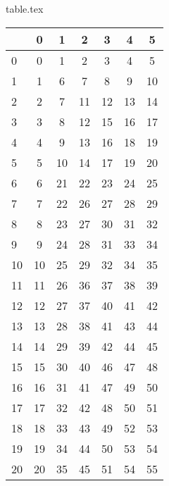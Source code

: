 
\begin{filecontents*}{table.tex}
\begin{tabular}{|l|cccccc|}
\hline
& 0 &  1 &  2 &  3 &  4 &  5 \\
\hline
 0& 0 &  1 &  2 &  3 &  4 &  5 \\
 1 &  1 &  6 &  7 &  8 &  9 & 10 \\
 2&   2 &  7 & 11 & 12 & 13 & 14 \\
3 &  3 &  8 & 12 & 15 & 16 & 17 \\
4 &  4 &  9 & 13 & 16 & 18 & 19 \\
 5&  5 & 10 & 14 & 17 & 19 & 20 \\ \cline{2-7}
 6&  \multicolumn{1}{|c|}{  6 }& 21 & 22 & 23 & 24 & 25\\
7 &   \multicolumn{1}{|c|}{ 7 }& 22 & 26 & 27 & 28 & 29\\
 8&   \multicolumn{1}{|c|}{ 8 }& 23 & 27 & 30 & 31 & 32\\
 9&   \multicolumn{1}{|c|}{ 9 }& 24 & 28 & 31 & 33 & 34\\
 10&  \multicolumn{1}{|c|}{ 10} & 25 & 29 & 32 & 34 & 35 \\ \cline{3-7}
 11&  11 &  \multicolumn{1}{c|}{ 26 }& 36 & 37 & 38 & 39 \\
 12&  12 & \multicolumn{1}{c|}{  27} & 37 & 40 & 41 & 42 \\
13& 13 &   \multicolumn{1}{c|}{  28} & 38 & 41 & 43 & 44 \\
14& 14 &   \multicolumn{1}{c|}{  29} & 39 & 42 & 44 & 45 \\  \cline{4-7}
15&  15 & 30 & \multicolumn{1}{c|}{   40 }& 46 & 47 & 48 \\
16&  16 & 31 &  \multicolumn{1}{c|}{  41 }& 47 & 49 & 50 \\
17&  17 & 32 &  \multicolumn{1}{c|}{  42 }& 48 & 50 & 51 \\  \cline{5-7}
18&  18 & 33 & 43 & \multicolumn{1}{c|}{   49 }& 52 & 53 \\
19&  19 & 34 & 44 & \multicolumn{1}{c|}{   50 }& 53 & 54 \\  \cline{6-7}
20&  20 & 35 & 45 & 51 & \multicolumn{1}{c|}{  54 }&  55 \\ \cline{7-7} 
 \hline
 \end{tabular}
\end{filecontents*}



\documentclass[preprint,12pt]{elsarticle}
\usepackage{amsmath,amssymb}
\usepackage{graphicx}
\usepackage{physics}
\usepackage{comment}
\usepackage{hyperref}
\usepackage{color,soul}



